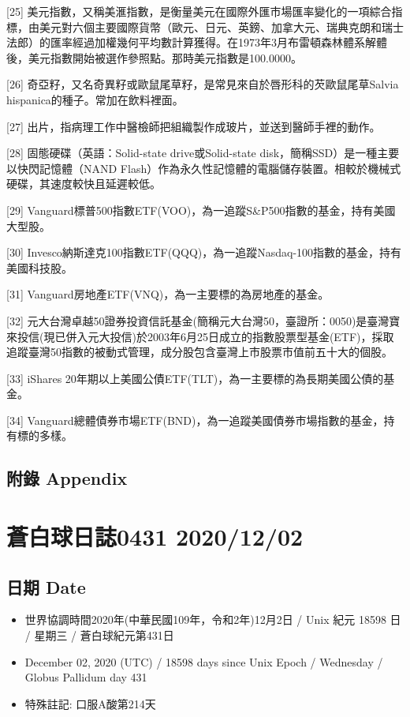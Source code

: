 \documentclass[a5paper, 11pt
]{book}
\providecommand{\tightlist}{%
  \setlength{\itemsep}{0pt}\setlength{\parskip}{0pt}}
\begin{document}
{[}25{]}
美元指數，又稱美滙指數，是衡量美元在國際外匯市場匯率變化的一項綜合指標，由美元對六個主要國際貨幣（歐元、日元、英鎊、加拿大元、瑞典克朗和瑞士法郎）的匯率經過加權幾何平均數計算獲得。在1973年3月布雷頓森林體系解體後，美元指數開始被選作參照點。那時美元指數是100.0000。

{[}26{]}
奇亞籽，又名奇異籽或歐鼠尾草籽，是常見來自於唇形科的芡歐鼠尾草Salvia
hispanica的種子。常加在飲料裡面。

{[}27{]}
出片，指病理工作中醫檢師把組織製作成玻片，並送到醫師手裡的動作。

{[}28{]} 固態硬碟（英語：Solid-state drive或Solid-state
disk，簡稱SSD）是一種主要以快閃記憶體（NAND
Flash）作為永久性記憶體的電腦儲存裝置。相較於機械式硬碟，其速度較快且延遲較低。

{[}29{]}
Vanguard標普500指數ETF(VOO)，為一追蹤S\&P500指數的基金，持有美國大型股。

{[}30{]}
Invesco納斯達克100指數ETF(QQQ)，為一追蹤Nasdaq-100指數的基金，持有美國科技股。

{[}31{]} Vanguard房地產ETF(VNQ)，為一主要標的為房地產的基金。

{[}32{]}
元大台灣卓越50證券投資信託基金(簡稱元大台灣50，臺證所：0050)是臺灣寶來投信(現已併入元大投信)於2003年6月25日成立的指數股票型基金(ETF)，採取追蹤臺灣50指數的被動式管理，成分股包含臺灣上市股票市值前五十大的個股。

{[}33{]} iShares
20年期以上美國公債ETF(TLT)，為一主要標的為長期美國公債的基金。

{[}34{]}
Vanguard總體債券市場ETF(BND)，為一追蹤美國債券市場指數的基金，持有標的多樣。

\hypertarget{ux9644ux9304-appendix}{%
\subsection{附錄 Appendix}\label{ux9644ux9304-appendix}}

\hypertarget{ux84bcux767dux7403ux65e5ux8a8c0431-20201202}{%
\section{蒼白球日誌0431
2020/12/02}\label{ux84bcux767dux7403ux65e5ux8a8c0431-20201202}}

\hypertarget{ux65e5ux671f-date-1}{%
\subsection{日期 Date}\label{ux65e5ux671f-date-1}}

\begin{itemize}
\tightlist
\item
  世界協調時間2020年(中華民國109年，令和2年)12月2日 / Unix 紀元 18598 日
  / 星期三 / 蒼白球紀元第431日
\item
  December 02, 2020 (UTC) / 18598 days since Unix Epoch / Wednesday /
  Globus Pallidum day 431
\item
  特殊註記: 口服A酸第214天
\end{itemize}
\end{document}
